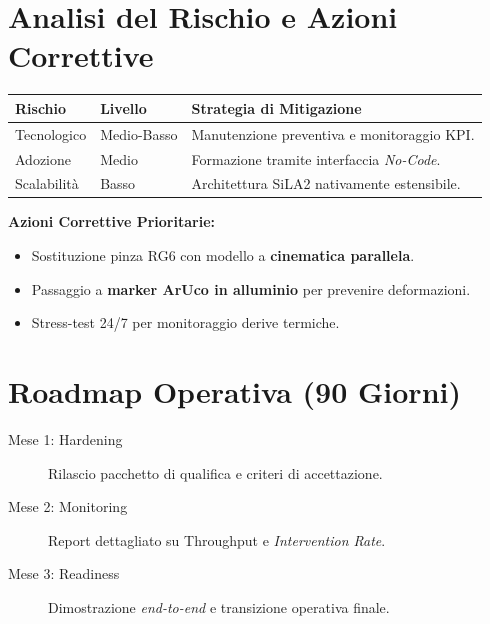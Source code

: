 \documentclass[a4paper,11pt]{article}
\begin{document}
	\section{Analisi del Rischio e Azioni Correttive}
	\begin{table}[h!]
		\centering
		\begin{tabular}{@{}lll@{}}
			\toprule
			\textbf{Rischio} & \textbf{Livello} & \textbf{Strategia di Mitigazione} \\ \midrule
			Tecnologico & Medio-Basso & Manutenzione preventiva e monitoraggio KPI. \\
			Adozione & Medio & Formazione tramite interfaccia \textit{No-Code}. \\
			Scalabilità & Basso & Architettura SiLA2 nativamente estensibile. \\ \bottomrule
		\end{tabular}
	\end{table}
	
	\textbf{Azioni Correttive Prioritarie:}
	\begin{itemize}
		\item Sostituzione pinza RG6 con modello a \textbf{cinematica parallela}.
		\item Passaggio a \textbf{marker ArUco in alluminio} per prevenire deformazioni.
		\item Stress-test 24/7 per monitoraggio derive termiche.
	\end{itemize}
	
	\section{Roadmap Operativa (90 Giorni)}
	\begin{description}
		\item[Mese 1: Hardening] Rilascio pacchetto di qualifica e criteri di accettazione.
		\item[Mese 2: Monitoring] Report dettagliato su Throughput e \textit{Intervention Rate}.
		\item[Mese 3: Readiness] Dimostrazione \textit{end-to-end} e transizione operativa finale.
	\end{description}
	
\end{document}
